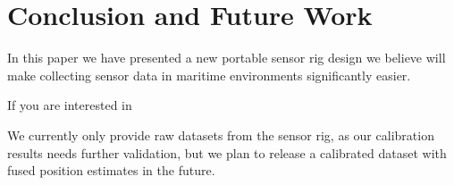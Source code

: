 \section{Conclusion and Future Work}
In this paper we have presented a new portable sensor rig design we believe will make collecting sensor data in maritime environments significantly easier.

If you are interested in


We currently only provide raw datasets from the sensor rig, as our calibration results needs further validation, but we plan to release a calibrated dataset with fused position estimates in the future.
